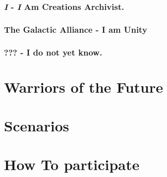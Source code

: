 \documentclass[a4paper,12pt]{report}
\begin{document}
\subsection{\textit{I} - \textit{I} Am Creations Archivist.}

\subsection{The Galactic Alliance - I am Unity}

\subsection{??? - I do not yet know.}

\chapter{Warriors of the Future}

\chapter{Scenarios}

\chapter{How To participate}
\end{document}
